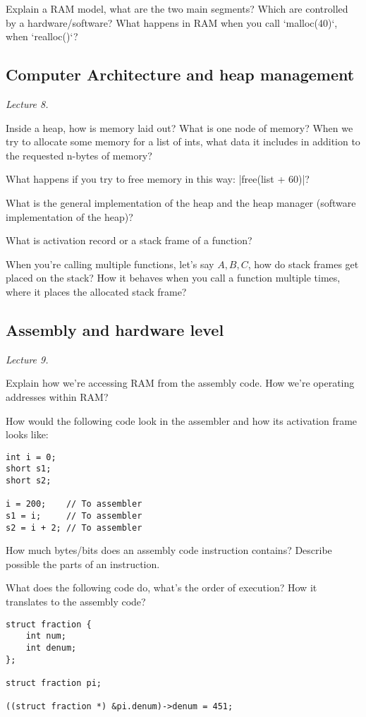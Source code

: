 Explain a RAM model, what are the two main segments? Which are controlled by a
hardware/software? What happens in RAM when you call `malloc(40)`, when `realloc()`?

\subsection{Computer Architecture and heap management}%
\label{sub:computer_architecture_and_heap_management}

\textit{Lecture 8.}

Inside a heap, how is memory laid out? What is one node of memory? When we try
to allocate some memory for a list of ints, what data it includes in addition
to the requested n-bytes of memory?

What happens if you try to free memory in this way: |free(list + 60)|?

What is the general implementation of the heap and the heap manager (software
implementation of the heap)?

What is activation record or a stack frame of a function?

When you're calling multiple functions, let's say $A, B, C$, how do stack
frames get placed on the stack? How it behaves when you call a function
multiple times, where it places the allocated stack frame?

\subsection{Assembly and hardware level}%
\label{sub:assembly_and_hardware_level}

\textit{Lecture 9.}

Explain how we're accessing RAM from the assembly code. How we're operating
addresses within RAM?

How would the following code look in the assembler and how its activation frame
looks like:
\begin{lstlisting}
int i = 0;
short s1;
short s2;

i = 200;    // To assembler
s1 = i;     // To assembler
s2 = i + 2; // To assembler
\end{lstlisting}

How much bytes/bits does an assembly code instruction contains? Describe
possible the parts of an instruction.

What does the following code do, what's the order of execution? How it
translates to the assembly code?
\begin{lstlisting}
struct fraction {
    int num;
    int denum;
};

struct fraction pi;

((struct fraction *) &pi.denum)->denum = 451;
\end{lstlisting}

